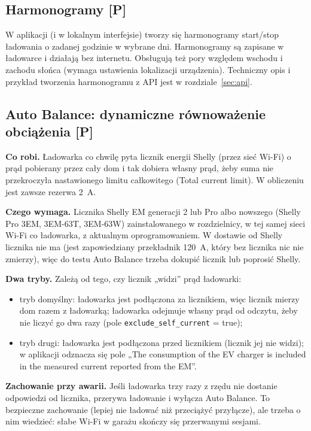 \documentclass[11pt,a4paper]{article}
\newcommand{\tagP}{\textcolor{apgreen}{\textbf{[P]}}}
\newcommand{\code}[1]{\texttt{#1}}
\begin{document}
\subsection{Harmonogramy \tagP}

W aplikacji (i w lokalnym interfejsie) tworzy się harmonogramy start/stop ładowania o zadanej godzinie w wybrane dni. Harmonogramy są zapisane w ładowarce i działają bez internetu. Obsługują też pory względem wschodu i zachodu słońca (wymaga ustawienia lokalizacji urządzenia). Techniczny opis i przykład tworzenia harmonogramu z API jest w rozdziale~\ref{sec:api}.

\subsection{Auto Balance: dynamiczne równoważenie obciążenia \tagP}

\textbf{Co robi.} Ładowarka co chwilę pyta licznik energii Shelly (przez sieć Wi-Fi) o prąd pobierany przez cały dom i tak dobiera własny prąd, żeby suma nie przekroczyła nastawionego limitu całkowitego (Total current limit). W obliczeniu jest zawsze rezerwa 2~A.

\textbf{Czego wymaga.} Licznika Shelly EM generacji 2 lub Pro albo nowszego (Shelly Pro 3EM, 3EM-63T, 3EM-63W) zainstalowanego w rozdzielnicy, w tej samej sieci Wi-Fi co ładowarka, z aktualnym oprogramowaniem. W dostawie od Shelly licznika nie ma (jest zapowiedziany przekładnik 120~A, który bez licznika nic nie zmierzy), więc do testu Auto Balance trzeba dokupić licznik lub poprosić Shelly.

\textbf{Dwa tryby.} Zależą od tego, czy licznik „widzi” prąd ładowarki:
\begin{itemize}
\item tryb domyślny: ładowarka jest podłączona za licznikiem, więc licznik mierzy dom razem z ładowarką; ładowarka odejmuje własny prąd od odczytu, żeby nie liczyć go dwa razy (pole \code{exclude\_self\_current} = true);
\item tryb drugi: ładowarka jest podłączona przed licznikiem (licznik jej nie widzi); w aplikacji odznacza się pole „The consumption of the EV charger is included in the measured current reported from the EM”.
\end{itemize}

\textbf{Zachowanie przy awarii.} Jeśli ładowarka trzy razy z rzędu nie dostanie odpowiedzi od licznika, przerywa ładowanie i wyłącza Auto Balance. To bezpieczne zachowanie (lepiej nie ładować niż przeciążyć przyłącze), ale trzeba o nim wiedzieć: słabe Wi-Fi w garażu skończy się przerwanymi sesjami.
\end{document}
